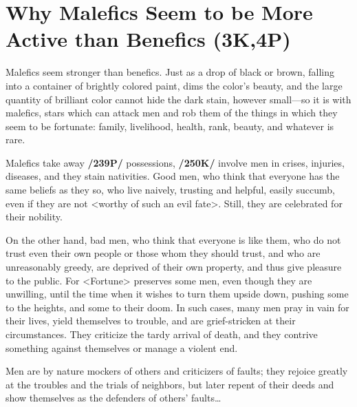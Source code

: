\section{Why Malefics Seem to be More Active than Benefics (3K,4P)}

Malefics seem stronger than benefics. Just as a drop of black or brown, falling into a container of brightly colored paint, dims the color’s beauty, and the large quantity of brilliant color cannot hide the dark stain, however small—so it is with malefics, stars which can attack men and rob them of the things in which they seem to be fortunate: family, livelihood, health, rank, beauty, and whatever is rare. 

Malefics take away \textbf{/239P/} possessions, \textbf{/250K/} involve men in crises, injuries, diseases, and they stain nativities. Good men, who think that everyone has the same beliefs as they so, who live naively, trusting and helpful, easily succumb, even if they are not <worthy of such an evil fate>. Still, they are celebrated for their
nobility. 

On the other hand, bad men, who think that everyone is like them, who do not trust even their own people or those whom they should trust, and who are unreasonably greedy, are deprived of their own property, and thus give pleasure to the public. For <Fortune> preserves some men, even though they are unwilling, until the time when it wishes to turn them upside down, pushing some to the heights, and some to their doom. In such cases, many men pray in vain for their lives, yield themselves to trouble, and are grief-stricken at their circumstances. They criticize the tardy arrival of death, and they contrive something against themselves or manage a violent end. 


Men are by nature mockers of others and criticizers of faults; they rejoice greatly at the troubles and the trials of neighbors, but later repent of their deeds and show themselves as the defenders of others’ faults…

